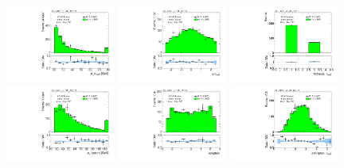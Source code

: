 \clearpage
\begin{figure}[tp]
  \centering
  \includegraphics[width=0.32\textwidth]{figures/analysis/vbf-MCXSR/tau-pt}
  \includegraphics[width=0.32\textwidth]{figures/analysis/vbf-MCXSR/tau-eta}
  \includegraphics[width=0.32\textwidth]{figures/analysis/vbf-MCXSR/tau-numTrack}
  \includegraphics[width=0.32\textwidth]{figures/analysis/vbf-MCXSR/lep-pt-hi}
  \includegraphics[width=0.32\textwidth]{figures/analysis/vbf-MCXSR/lep-eta}
  \includegraphics[width=0.32\textwidth]{figures/analysis/vbf-MCXSR/taulep-dR}

\end{figure}
